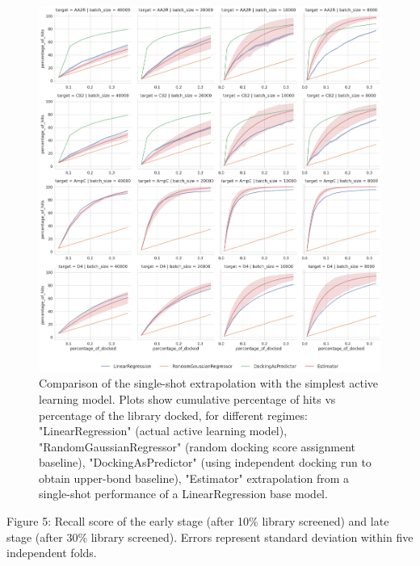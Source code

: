 \begin{figure}[ht]
\centering
\includegraphics[width=1.0\textwidth]{figures/figure_4_iterations.png}
\caption{Comparison of the single-shot extrapolation with the simplest active learning model. Plots show cumulative percentage of hits vs percentage of the library docked, for different regimes: "LinearRegression" (actual active learning model), "RandomGaussianRegressor" (random docking score assignment baseline), "DockingAsPredictor" (using independent docking run to obtain upper-bond baseline), "Estimator" extrapolation from a single-shot performance of a LinearRegression base model.}
\label{fig:fig_4_extrapolation}
\end{figure}

\begin{table}[!ht]
    \centering
    \begin{adjustbox}{angle=90}
        \resizebox{1.2\textwidth}{!}
        {
            
        }
    \end{adjustbox}
    \caption{Figure 5: Recall score of the early stage (after 10\% library screened) and late stage (after 30\% library screened). Errors represent standard deviation within five independent folds.}
    \label{tab:tab_1_activelearning}
\end{table}

